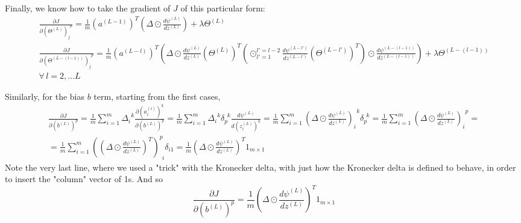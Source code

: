 \documentclass[10pt]{amsart}
\begin{document}
\begin{multicols*}{2}
Finally, we know how to take the gradient of $J$ of this particular form:  
\begin{equation}\label{Eq:DNN_gradJ_L2norm_Thetas}
\boxed{\begin{gathered}
	\frac{ \partial J }{ \partial (\Theta^{(L)})_j^{\  \  p} } = \frac{1}{m} (a^{(L-1)})^T \left( \Delta \odot \frac{d\psi^{(L)} }{ dz^{(L)} } \right) + \lambda \Theta^{(L)}	\\
	\frac{ \partial J }{ \partial (\Theta^{(L-(l-1))})_j^{\  \  p} } = \frac{1}{m} (a^{(L-l)})^T \left( \Delta \odot \frac{d\psi^{(L)}}{dz^{(L)} } (\Theta^{(L)})^T \left( \odot_{l'=1}^{l'=l-2} \frac{d\psi^{(L-l')}}{dz^{(L-l') } } (\Theta^{(L-l')})^T \right) \odot \frac{d\psi^{(L-(l-1)) } }{ dz^{(L-(l-1)) } } \right) + \lambda \Theta^{(L-(l-1)) } \\
	\forall \, l = 2,\dots L 
\end{gathered}}
\end{equation}

Similarly, for the bias $b$ term, starting from the first cases, 
\[
\begin{gathered}
\frac{ \partial J }{ \partial (b^{(L)})^p} = \frac{1}{m} \sum_{i=1}^m \Delta_i^{\  \  k}  \frac{ \partial (a_i^{(i)})^k }{ \partial (b^{(L)})^p} = \frac{1}{m} \sum_{i=1}^m \Delta_i^{\  \  k} \delta_p^{\  \  k} \frac{d \psi^{(L)} }{ d(z_i^{(L)})^k} = \frac{1}{m} \sum_{i=1}^m (\Delta \odot \frac{d\psi^{(L)}}{ dz^{(L)}} )_i^{\  \  k} \delta_p^{\  \  k} = \frac{1}{m} \sum_{i=1}^m (\Delta \odot \frac{d\psi^{(L)}}{ dz^{(L)}})_i^{\  \  p} = \\
= \frac{1}{m} \sum_{i=1}^m ((\Delta \odot \frac{d\psi^{(L)}}{dz^{(L)}})^T)^p_{\  \  i } \delta_{i1} = \frac{1}{m} ( \Delta \odot \frac{d\psi^{(L)}}{dz^{(L)}})^T 1_{m\times 1}
\end{gathered}
\]
Note the very last line, where we used a "trick" with the Kronecker delta, with just how the Kronecker delta is defined to behave, in order to insert the "column" vector of 1s.  And so 
\begin{equation}
\frac{\partial J}{ \partial (b^{(L)})^p } = \frac{1}{m} ( \Delta \odot \frac{d\psi^{(L)}}{dz^{(L)}})^T 1_{m\times 1}  
\end{equation}


\end{multicols*}
\end{document}
